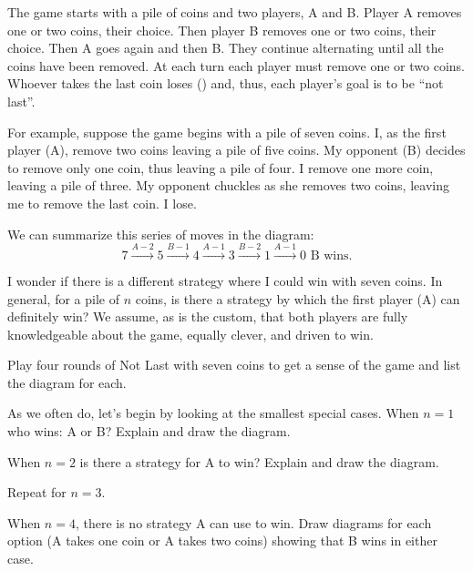 \begin{act}
\label{act_not_last}

The  game starts with a pile of coins and two players, A and B.  Player A removes one or two coins, their choice.  Then player B removes one or two coins, their choice.  Then A goes again and then B.  They continue alternating until all the coins have been removed. At each turn each player must remove one or two coins.  Whoever takes the last coin loses () and, thus, each player's goal is to be ``not last''.  

For example, suppose the game begins with a pile of seven coins.  I, as the first player (A), remove two coins leaving a pile of five coins.  My opponent (B) decides to remove only one coin, thus leaving a pile of four.  I remove one more coin, leaving a pile of three.  My opponent chuckles as she removes two coins, leaving me to remove the last coin.  I lose. 

We can summarize this series of moves in the diagram: $$ 7 \xrightarrow{A-2} 5 \xrightarrow{B-1} 4 \xrightarrow{A-1} 3 \xrightarrow{B-2} 1 \xrightarrow{A-1} 0 \text{ B wins}.$$

I wonder if there is a different strategy where I could win with seven coins.  In general, for a pile of $n$ coins, is there a strategy by which the first player (A) can definitely win?  We assume, as is the custom, that both players are fully knowledgeable about the game, equally clever, and driven to win.

    \begin{actpart}
        \item Play four rounds of Not Last with seven coins to get a sense of the game and list the diagram for each.
    
        \item As we often do, let's begin by looking at the smallest special cases.  When $n=1$ who wins: A or B? Explain and draw the diagram. 
    
        \item When $n=2$ is there a strategy for A to win? Explain and draw the diagram.
    
        \item Repeat for $n=3$.
    
        \item When $n=4$, there is no strategy A can use to win. Draw diagrams for each option (A takes one coin or A takes two coins) showing that B wins in either case.
    

\end{actpart}
\end{act}
